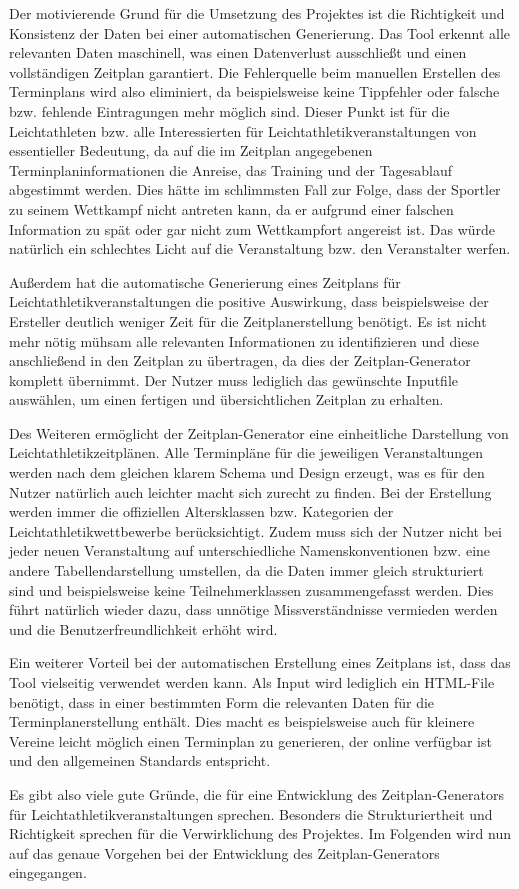 Der motivierende Grund für die Umsetzung des Projektes ist die Richtigkeit und Konsistenz der Daten bei einer automatischen Generierung. Das Tool erkennt alle relevanten Daten maschinell, was einen Datenverlust ausschließt und einen vollständigen Zeitplan garantiert. Die Fehlerquelle beim manuellen Erstellen des Terminplans wird also eliminiert, da beispielsweise keine Tippfehler oder falsche bzw. fehlende Eintragungen mehr möglich sind. Dieser Punkt ist für die Leichtathleten bzw. alle Interessierten für Leichtathletikveranstaltungen von essentieller Bedeutung, da auf die im Zeitplan angegebenen Terminplaninformationen die Anreise, das Training und der Tagesablauf abgestimmt werden. Dies hätte im schlimmsten Fall zur Folge, dass der Sportler zu seinem Wettkampf nicht antreten kann, da er aufgrund einer falschen Information zu spät oder gar nicht zum Wettkampfort angereist ist. Das würde natürlich ein schlechtes Licht auf die Veranstaltung bzw. den Veranstalter werfen.

Außerdem hat die automatische Generierung eines Zeitplans für Leichtathletikveranstaltungen die positive Auswirkung, dass beispielsweise der Ersteller deutlich weniger Zeit für die Zeitplanerstellung benötigt. Es ist nicht mehr nötig mühsam alle relevanten Informationen zu identifizieren und diese anschließend in den Zeitplan zu übertragen, da dies der Zeitplan-Generator komplett übernimmt. Der Nutzer muss lediglich das gewünschte Inputfile auswählen, um einen fertigen und übersichtlichen Zeitplan zu erhalten. 

Des Weiteren ermöglicht der Zeitplan-Generator eine einheitliche Darstellung von Leichtathletikzeitplänen. Alle Terminpläne für die jeweiligen Veranstaltungen werden nach dem gleichen klarem Schema und Design erzeugt, was es für den Nutzer natürlich auch leichter macht sich zurecht zu finden. Bei der Erstellung werden immer die offiziellen Altersklassen bzw. Kategorien der Leichtathletikwettbewerbe berücksichtigt. Zudem muss sich der Nutzer nicht bei jeder neuen Veranstaltung auf unterschiedliche Namenskonventionen bzw. eine andere Tabellendarstellung umstellen, da die Daten immer gleich strukturiert sind und beispielsweise keine Teilnehmerklassen zusammengefasst werden. Dies führt natürlich wieder dazu, dass unnötige Missverständnisse vermieden werden und die Benutzerfreundlichkeit erhöht wird.

Ein weiterer Vorteil bei der automatischen Erstellung eines Zeitplans ist, dass das Tool vielseitig verwendet werden kann. Als Input wird lediglich ein HTML-File benötigt, dass in einer bestimmten Form die relevanten Daten für die Terminplanerstellung enthält. Dies macht es beispielsweise auch für kleinere Vereine leicht möglich einen Terminplan zu generieren, der online verfügbar ist und den allgemeinen Standards entspricht.

Es gibt also viele gute Gründe, die für eine Entwicklung des Zeitplan-Generators für Leichtathletikveranstaltungen sprechen. Besonders die Strukturiertheit und Richtigkeit sprechen für die Verwirklichung des Projektes. Im Folgenden wird nun auf das genaue Vorgehen bei der Entwicklung des Zeitplan-Generators eingegangen.



